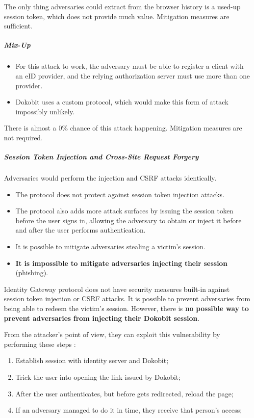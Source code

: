 The only thing adversaries could extract from the browser history is a used-up session token, which does not provide much value. Mitigation measures are sufficient.

\subparagraph{Mix-Up}

\begin{itemize}
  \item For this attack to work, the adversary must be able to register a client with an eID provider, and the relying authorization server must use more than one provider.
  \item Dokobit uses a custom protocol, which would make this form of attack impossibly unlikely.
\end{itemize}

There is almost a 0\% chance of this attack happening. Mitigation measures are not required.

\subparagraph{Session Token Injection and Cross-Site Request Forgery}

Adversaries would perform the injection and CSRF attacks identically.

\begin{itemize}
  \item The protocol does not protect against session token injection attacks.
  \item The protocol also adds more attack surfaces by issuing the session token before the user signs in, allowing the adversary to obtain or inject it before and after the user performs authentication.
  \item It is possible to mitigate adversaries stealing a victim's session.
  \item \textbf{It is impossible to mitigate adversaries injecting their session} (phishing).
\end{itemize}

Identity Gateway protocol does not have security measures built-in against session token injection or CSRF attacks. It is possible to prevent adversaries from being able to redeem the victim's session. However, there is \textbf{no possible way to prevent adversaries from injecting their Dokobit session}.

From the attacker's point of view, they can exploit this vulnerability by performing these steps \cite{video-exploitdokobit}:

\begin{enumerate}
  \item Establish session with identity server and Dokobit;
  \item Trick the user into opening the link issued by Dokobit;
  \item After the user authenticates, but before gets redirected, reload the page;
  \item If an adversary managed to do it in time, they receive that person's access;
\end{enumerate}

